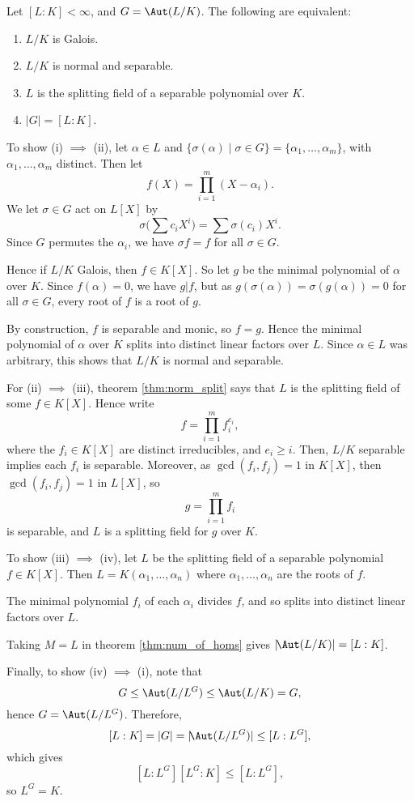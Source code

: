 \documentclass[12pt]{article}
\begin{document}
\begin{theorem}\label{thm:class_gal_ext}
	Let $[L:K]< \infty$, and $G = \Aut(L/K)$. The following are equivalent:
	\begin{enumerate}[\normalfont(i)]
		\item $L/K$ is Galois.
		\item $L/K$ is normal and separable.
		\item $L$ is the splitting field of a separable polynomial over $K$.
		\item $|G| = [L:K]$.
	\end{enumerate}
\end{theorem}

\begin{proofbox}
	To show (i) $\implies$ (ii), let $\alpha \in L$ and $\{\sigma(\alpha) \mid \sigma \in G\} = \{\alpha_1, \ldots, \alpha_m\}$, with $\alpha_1, \ldots, \alpha_m$ distinct. Then let
	\[
	f(X) = \prod_{i = 1}^{m}(X - \alpha_i).
	\]
	We let $\sigma \in G$ act on $L[X]$ by
	\[
	\sigma\Biggl( \sum c_i X^i \biggr) = \sum \sigma(c_i) X^i.
	\]
	Since $G$ permutes the $\alpha_i$, we have $\sigma f = f$ for all $\sigma \in G$.

	Hence if $L/K$ Galois, then $f \in K[X]$. So let $g$ be the minimal polynomial of $\alpha$ over $K$. Since $f(\alpha) = 0$, we have $g | f$, but as $g(\sigma(\alpha)) = \sigma(g(\alpha)) = 0$ for all $\sigma \in G$, every root of $f$ is a root of $g$.

	By construction, $f$ is separable and monic, so $f = g$. Hence the minimal polynomial of $\alpha$ over $K$ splits into distinct linear factors over $L$. Since $\alpha \in L$ was arbitrary, this shows that $L/K$ is normal and separable.

	For (ii) $\implies$ (iii), theorem \ref{thm:norm_split} says that $L$ is the splitting field of some $f \in K[X]$. Hence write
	\[
	f = \prod_{i = 1}^{m} f_i^{e_i},
	\]
	where the $f_i \in K[X]$ are distinct irreducibles, and $e_i \geq i$. Then, $L/K$ separable implies each $f_i$ is separable. Moreover, as $\gcd(f_i, f_j) = 1$ in $K[X]$, then $\gcd(f_i, f_j) = 1$ in $L[X]$, so
	\[
	g = \prod_{i = 1}^{m} f_i
	\]
	is separable, and $L$ is a splitting field for $g$ over $K$.

	To show (iii) $\implies$ (iv), let $L$ be the splitting field of a separable polynomial $f \in K[X]$. Then $L = K(\alpha_1, \ldots, \alpha_n)$ where $\alpha_1, \ldots, \alpha_n$ are the roots of $f$.

	The minimal polynomial $f_i$ of each $\alpha_i$ divides $f$, and so splits into distinct linear factors over $L$.

	Taking $M = L$ in theorem \ref{thm:num_of_homs} gives $|\!\Aut(L/K)| = [L:K]$.

	Finally, to show (iv) $\implies$ (i), note that
	\[
	G \leq \Aut(L/L^G) \leq \Aut(L/K) = G,
	\]
	hence $G = \Aut(L/L^G)$. Therefore,
	\[
		[L:K] = |G| = |\!\Aut(L/L^G)| \leq [L:L^G],
	\]
	which gives
	\[
		[L:L^G][L^G:K] \leq [L:L^G],
	\]
	so $L^G = K$.
\end{proofbox}
\end{document}
